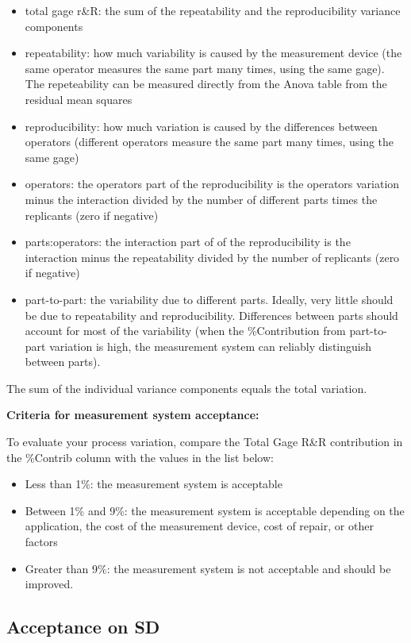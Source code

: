 \documentclass[
]{book}
\providecommand{\tightlist}{%
  \setlength{\itemsep}{0pt}\setlength{\parskip}{0pt}}
\begin{document}
\begin{itemize}
\tightlist
\item
  total gage r\&R: the sum of the repeatability and the reproducibility variance components
\item
  repeatability: how much variability is caused by the measurement device (the same operator measures the same part many times, using the same gage). The repeteability can be measured directly from the Anova table from the residual mean squares
\item
  reproducibility: how much variation is caused by the differences between operators (different operators measure the same part many times, using the same gage)
\item
  operators: the operators part of the reproducibility is the operators variation minus the interaction divided by the number of different parts times the replicants (zero if negative)
\item
  parts:operators: the interaction part of of the reproducibility is the interaction minus the repeatability divided by the number of replicants (zero if negative)
\item
  part-to-part: the variability due to different parts. Ideally, very little should be due to repeatability and reproducibility. Differences between parts should account for most of the variability (when the \%Contribution from part-to-part variation is high, the measurement system can reliably distinguish between parts).
\end{itemize}

The sum of the individual variance components equals the total variation.

\textbf{Criteria for measurement system acceptance:}

To evaluate your process variation, compare the Total Gage R\&R contribution in the \%Contrib column with the values in the list below:

\begin{itemize}
\tightlist
\item
  Less than 1\%: the measurement system is acceptable
\item
  Between 1\% and 9\%: the measurement system is acceptable depending on the application, the cost of the measurement device, cost of repair, or other factors
\item
  Greater than 9\%: the measurement system is not acceptable and should be improved.
\end{itemize}

\hypertarget{acceptance-on-sd}{%
\subsection{Acceptance on SD}\label{acceptance-on-sd}}
\end{document}
